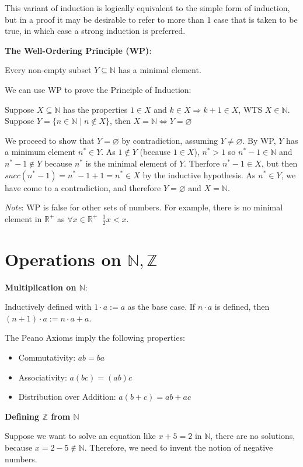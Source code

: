\documentclass{article}
\begin{document}
\begin{multicols*}{2}
This variant of induction is logically equivalent to the simple form of induction, but in a proof it may be desirable to refer to more than 1 case that is taken to be true, in which case a strong induction is preferred.

\textbf{The Well-Ordering Principle (WP)}:

Every non-empty subset $Y \subseteq \mathbb{N}$ has a minimal element.

We can use WP to prove the Principle of Induction:

Suppose $X \subseteq \mathbb{N}$ has the properties $1 \in X$ and $k \in X \Rightarrow k+1 \in X$, WTS $X \in \mathbb{N}$. Suppose $Y = \{ n \in \mathbb{N} \;|\; n \notin X\}$, then $X = \mathbb{N} \Leftrightarrow Y = \varnothing$

We proceed to show that $Y = \varnothing$ by contradiction, assuming $Y \neq \varnothing$. By WP, $Y$ has a minimum element $n^{*} \in Y$. As $1 \notin Y$ (because $1 \in X$), $n^* > 1$ so $n^* - 1 \in \mathbb{N}$ and $n^* - 1 \notin Y$ because $n^*$ is the minimal element of $Y$. Therfore $n^* - 1 \in X$, but then $succ(n^* - 1) = n^* - 1 + 1 = n^* \in X$ by the inductive hypothesis. As $n^* \in Y$, we have come to a contradiction, and therefore $Y = \varnothing$ and $X = \mathbb{N}$.

\textit{Note}: WP is false for other sets of numbers. For example, there is no minimal element in $\mathbb{R}^{+}$ as $\forall x \in \mathbb{R}^{+}\;\; \frac{1}{2}x < x$.

\section{Operations on $\mathbb{N, Z}$}

\textbf{Multiplication on $\mathbb{N}$}:

Inductively defined with $1 \cdot a := a$ as the base case. If $n \cdot a$ is defined, then $(n+1) \cdot a := n \cdot a + a$.

The Peano Axioms imply the following properties:
\begin{itemize}
    \item Commutativity: $ab = ba$
    \item Associativity: $a(bc) = (ab)c$
    \item Distribution over Addition: $a(b+c) = ab + ac$
\end{itemize}

\textbf{Defining $\mathbb{Z}$ from $\mathbb{N}$}

Suppose we want to solve an equation like $x+5 = 2$ in $\mathbb{N}$, there are no solutions, because $x = 2 -5 \notin \mathbb{N}$. Therefore, we need to invent the notion of negative numbers.


\end{multicols*}
\end{document}
